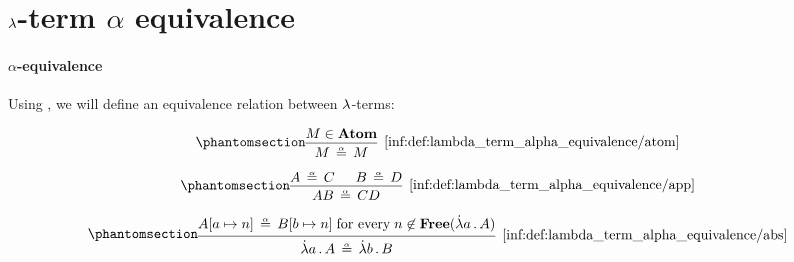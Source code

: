\section{\texorpdfstring{\( {\mathrm \lambda} \)}{λ}-term \texorpdfstring{\( \alpha \)}{α} equivalence}\label{sec:lambda_term_alpha_equivalence}

\paragraph{\( \alpha \)-equivalence}

\begin{definition}\label{def:lambda_term_alpha_equivalence}\mimprovised
  Using , we will define an equivalence relation between \( {\mathrm \lambda} \)-terms:

  \begin{paracol}{2}
    \begin{leftcolumn}
      \ParacolAlignmentHack
      \begin{equation*}\taglabel[\ensuremath{ \logic{Atom}_\alpha }]{inf:def:lambda_term_alpha_equivalence/atom}
        \begin{prooftree}
          \hypo{ M \in \op*{Atom} }
          \infer1[\ref{inf:def:lambda_term_alpha_equivalence/atom}]{ M \aequiv M }
        \end{prooftree}
      \end{equation*}
    \end{leftcolumn}

    \begin{rightcolumn}
      \ParacolAlignmentHack
      \begin{equation*}\taglabel[\ensuremath{ \logic{App}_\alpha }]{inf:def:lambda_term_alpha_equivalence/app}
        \begin{prooftree}
          \hypo{ A \aequiv C }
          \hypo{ B \aequiv D }
          \infer2[\ref{inf:def:lambda_term_alpha_equivalence/app}]{ AB \aequiv CD }
        \end{prooftree}
      \end{equation*}
    \end{rightcolumn}
  \end{paracol}

  \begin{equation*}\taglabel[\ensuremath{ \logic{Abs}_\alpha }]{inf:def:lambda_term_alpha_equivalence/abs}
    \begin{prooftree}
      \hypo{ A[a \mapsto n] \aequiv B[b \mapsto n] \T{for every} n \not\in \op*{Free}(\qabs a A) }
      \infer1[\ref{inf:def:lambda_term_alpha_equivalence/abs}]{ \qabs a A \aequiv \qabs b B }
    \end{prooftree}
  \end{equation*}


\end{definition}
